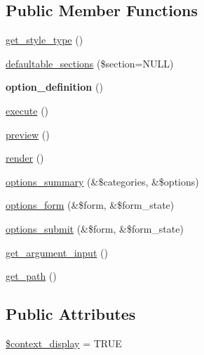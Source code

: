 \subsection*{Public Member Functions}
\begin{DoxyCompactItemize}
\item 
\hyperlink{classviews__content__plugin__display__ctools__context_a885535a2ef690f2bf5ccefef707b7d3c}{get\_\-style\_\-type} ()
\item 
\hyperlink{classviews__content__plugin__display__ctools__context_aac45cef6f7701e14689186da1cf10b92}{defaultable\_\-sections} (\$section=NULL)
\item 
\hypertarget{classviews__content__plugin__display__ctools__context_aae22ac5165b13f6f904e62c09cf21ab0}{
{\bfseries option\_\-definition} ()}
\label{classviews__content__plugin__display__ctools__context_aae22ac5165b13f6f904e62c09cf21ab0}

\item 
\hyperlink{classviews__content__plugin__display__ctools__context_a45d28ca00a2dc732cf72be0ea0318895}{execute} ()
\item 
\hyperlink{classviews__content__plugin__display__ctools__context_a6e61452a3694e1bf66281b4a7456299a}{preview} ()
\item 
\hyperlink{classviews__content__plugin__display__ctools__context_a98c81b35153f725da4632087e870b709}{render} ()
\item 
\hyperlink{classviews__content__plugin__display__ctools__context_a3299f180dd1ea735064cb7d63fd61774}{options\_\-summary} (\&\$categories, \&\$options)
\item 
\hyperlink{classviews__content__plugin__display__ctools__context_a7915e29e242e5accfa74ea8ceaa20b90}{options\_\-form} (\&\$form, \&\$form\_\-state)
\item 
\hyperlink{classviews__content__plugin__display__ctools__context_a8fa3f9293bec2891e2e87249ad748c67}{options\_\-submit} (\&\$form, \&\$form\_\-state)
\item 
\hyperlink{classviews__content__plugin__display__ctools__context_a01a8b7e0f1b7a8200a1a65386aa8921f}{get\_\-argument\_\-input} ()
\item 
\hyperlink{classviews__content__plugin__display__ctools__context_ae11e60c8046dcac9210f4c097606a4b7}{get\_\-path} ()
\end{DoxyCompactItemize}
\subsection*{Public Attributes}
\begin{DoxyCompactItemize}
\item 
\hyperlink{classviews__content__plugin__display__ctools__context_aaf85835385bb74b3d8c365f6caeea219}{\$context\_\-display} = TRUE
\end{DoxyCompactItemize}


